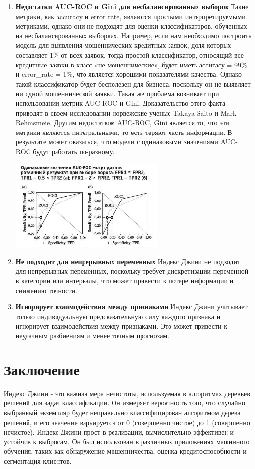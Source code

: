 \begin{enumerate}
    \item {\bf Недостатки AUC-ROC и Gini для несбалансированных выборок}
          Такие метрики, как accuracy и error rate, являются простыми интерпретируемыми метриками, однако они
          не подходят для оценки классификаторов, обученных на несбалансированных выборках. Например,
          если нам необходимо построить модель для выявления мошеннических кредитных заявок, доля которых
          составляет 1\% от всех заявок, тогда простой классификатор, относящий все кредитные заявки в класс «не мошеннические», будет иметь ассигасу = 99\% и error\_rate = 1\%, что является хорошими показателями качества. Однако такой классификатор будет бесполезен для бизнеса, поскольку он не выявляет ни одной мошеннической заявки.
          Такая же проблема возникает при использовании метрик AUC-ROC и Gini. Доказательство этого факта приводят в своем исследовании норвежские ученые Takaya Saito и Mark Rehmsmeie.
          Другим недостатком AUC-ROC, Gini является то, что эти метрики являются
          интегральными, то есть теряют часть информации. В результате может оказаться, что модели с
          одинаковыми значениями AUC-ROC будут работать по-разному.

          \begin{center}
              \includegraphics[width=0.6\textwidth]{chapters/gini/pics/fff.jpeg}
          \end{center}
    \item {\bf Не подходит для непрерывных переменных} Индекс Джини не подходит для непрерывных переменных, поскольку требует дискретизации переменной в категории или интервалы, что может привести к потере информации и снижению точности.
    \item {\bf Игнорирует взаимодействия между признаками} Индекс Джини учитывает только индивидуальную предсказательную силу каждого признака и игнорирует взаимодействия между признаками. Это может привести к неудачным разбиениям и менее точным прогнозам.
\end{enumerate}

\section*{Заключение}
Индекс Джини - это важная мера нечистоты, используемая в алгоритмах деревьев решений для задач классификации. Он измеряет вероятность того, что случайно выбранный экземпляр будет неправильно классифицирован алгоритмом дерева решений, и его значение варьируется от 0 (совершенно чистое) до 1 (совершенно нечистое). Индекс Джини прост в реализации, вычислительно эффективен и устойчив к выбросам. Он был использован в различных приложениях машинного обучения, таких как обнаружение мошенничества, оценка кредитоспособности и сегментация клиентов.
